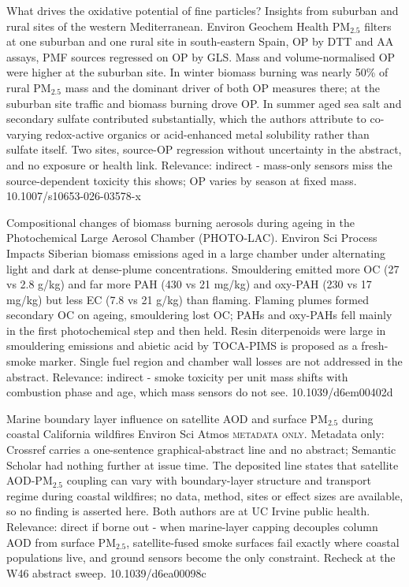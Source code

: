 \documentclass[10pt]{article}
\begin{document}
{What drives the oxidative potential of fine particles? Insights from suburban and rural sites of the western Mediterranean.}
{Environ Geochem Health}
{PM$_{2.5}$ filters at one suburban and one rural site in south-eastern Spain, OP by DTT and AA assays, PMF sources regressed on OP by GLS. Mass and volume-normalised OP were higher at the suburban site. In winter biomass burning was nearly 50\% of rural PM$_{2.5}$ mass and the dominant driver of both OP measures there; at the suburban site traffic and biomass burning drove OP. In summer aged sea salt and secondary sulfate contributed substantially, which the authors attribute to co-varying redox-active organics or acid-enhanced metal solubility rather than sulfate itself. Two sites, source-OP regression without uncertainty in the abstract, and no exposure or health link. Relevance: indirect - mass-only sensors miss the source-dependent toxicity this shows; OP varies by season at fixed mass.}
{10.1007/s10653-026-03578-x}

{Compositional changes of biomass burning aerosols during ageing in the Photochemical Large Aerosol Chamber (PHOTO-LAC).}
{Environ Sci Process Impacts}
{Siberian biomass emissions aged in a large chamber under alternating light and dark at dense-plume concentrations. Smouldering emitted more OC (27 vs 2.8 g/kg) and far more PAH (430 vs 21 mg/kg) and oxy-PAH (230 vs 17 mg/kg) but less EC (7.8 vs 21 g/kg) than flaming. Flaming plumes formed secondary OC on ageing, smouldering lost OC; PAHs and oxy-PAHs fell mainly in the first photochemical step and then held. Resin diterpenoids were large in smouldering emissions and abietic acid by TOCA-PIMS is proposed as a fresh-smoke marker. Single fuel region and chamber wall losses are not addressed in the abstract. Relevance: indirect - smoke toxicity per unit mass shifts with combustion phase and age, which mass sensors do not see.}
{10.1039/d6em00402d}

{Marine boundary layer influence on satellite AOD and surface PM$_{2.5}$ during coastal California wildfires}
{Environ Sci Atmos}
{\textsc{metadata only.} Metadata only: Crossref carries a one-sentence graphical-abstract line and no abstract; Semantic Scholar had nothing further at issue time. The deposited line states that satellite AOD-PM$_{2.5}$ coupling can vary with boundary-layer structure and transport regime during coastal wildfires; no data, method, sites or effect sizes are available, so no finding is asserted here. Both authors are at UC Irvine public health. Relevance: direct if borne out - when marine-layer capping decouples column AOD from surface PM$_{2.5}$, satellite-fused smoke surfaces fail exactly where coastal populations live, and ground sensors become the only constraint. Recheck at the W46 abstract sweep.}
{10.1039/d6ea00098c}
\end{document}
